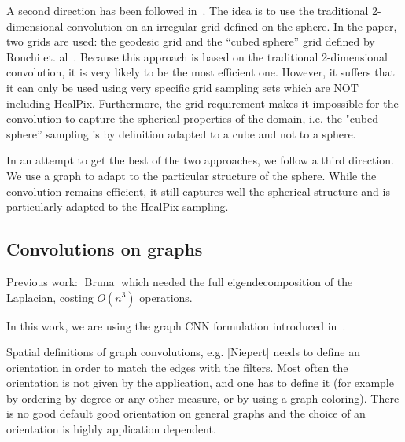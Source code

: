\documentclass[preprint,12pt,authoryear]{elsarticle}
\newcommand{\nati}[1]{{\color[rgb]{.1,.6,.1}{#1}}}
\newcommand{\todo}[1]{{\color[rgb]{.6,.1,.6}{#1}}}
\newcommand{\assign}[1]{{\color[rgb]{.8,.5,.8}{Assigned: #1 }}}
\begin{document}
A second direction has been followed in~\cite{boomsma2017spherical}. The idea is
to use the traditional 2-dimensional convolution on an irregular grid defined on the
sphere. In the paper, two grids are used: the geodesic grid and the “cubed
sphere” grid defined by Ronchi et. al~\cite{ronchi1996cubed}. Because this
approach is based on the traditional 2-dimensional convolution, it is very likely to be the
most efficient one. However, it suffers that it can only be used using very
specific grid sampling sets which are NOT including HealPix. Furthermore, the
grid requirement makes it impossible for the convolution to capture the
spherical properties of the domain, i.e. the "cubed sphere” sampling is by
definition adapted to a cube and not to a sphere. \nati{Michael: Under some very
specific hypothesis, this second approach is a particular case of our method,
i.e. 1) our method with a stupid sampling, 2) assumption that graph convolution
on a grid == 2d convolution. Do you think we should mention that? I think we
should not.}

In an attempt to get the best of the two approaches, we follow a third
direction. We use a graph to adapt to the particular structure of the sphere.
While the convolution remains efficient, it still captures well the spherical
structure and is particularly adapted to the HealPix sampling.

\subsection{Convolutions on graphs}
\assign{Michaël}

\todo{other approaches? GNNs, Kipf first order approx, message passing}

Previous work: [Bruna] which needed the full eigendecomposition of the Laplacian, costing $O(n^3)$ operations.

In this work, we are using the graph CNN formulation introduced in~\cite{defferrard2016convolutional}.

Spatial definitions of graph convolutions, e.g. [Niepert] needs to define an orientation in order to match the edges with the filters. Most often the orientation is not given by the application, and one has to define it (for example by ordering by degree or any other measure, or by using a graph coloring). There is no good default good orientation on general graphs and the choice of an orientation is highly application dependent.

\todo{Cool to have a global illustration of the network (CNN like)}
\end{document}
